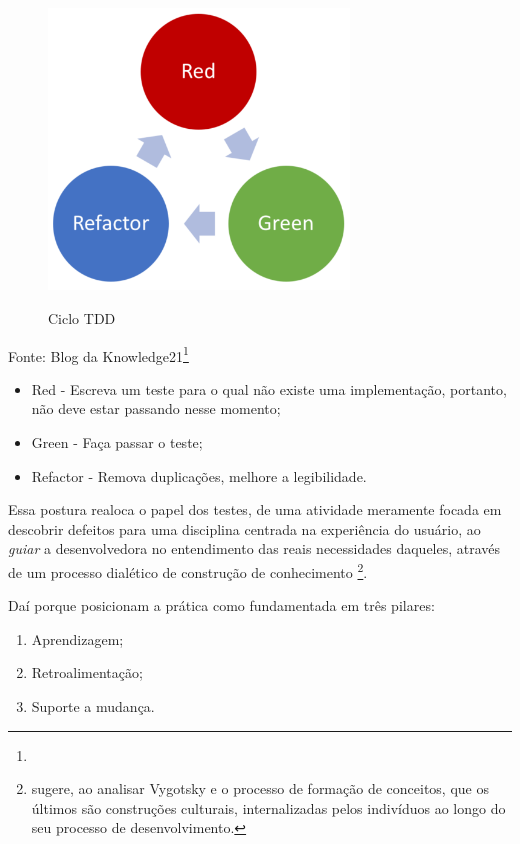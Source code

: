 \documentclass[12pt,a4paper,oneside,english,brazil]{article}
\begin{document}
      \begin{center}
        \begin{figure}[h]
          \centering
          \caption{Ciclo TDD}
          \includegraphics[width=8cm]{ciclo-tdd}
          \label{fig:ciclotdd}
        \end{figure}
        Fonte: Blog da Knowledge21\footnote{}
      \end{center}

      \begin{itemize}
        \item Red - Escreva um teste para o qual não existe uma
          implementação, portanto, não deve estar passando nesse
          momento;
        \item Green - Faça passar o teste;
        \item Refactor - Remova duplicações,  melhore a legibilidade.
      \end{itemize}

      Essa postura realoca o papel dos testes, de uma atividade meramente focada
      em descobrir defeitos para uma disciplina centrada na experiência do
      usuário, ao  \emph{guiar} a desenvolvedora no entendimento das reais
      necessidades daqueles, através de um processo dialético de construção de
      conhecimento \footnote{ sugere, ao analisar
      Vygotsky e o processo de formação de conceitos, que os últimos são
      construções culturais, internalizadas pelos indivíduos ao longo do seu
      processo de desenvolvimento.}.

      Daí porque  posicionam a prática como
      fundamentada em três pilares:
      \begin{enumerate}
        \item Aprendizagem;
        \item Retroalimentação;
        \item Suporte a mudança.
      \end{enumerate}
\end{document}
